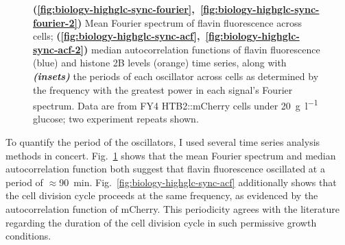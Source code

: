 \begin{figure}
  \caption{
    \textbf{(\ref{fig:biology-highglc-sync-fourier},~\ref{fig:biology-highglc-sync-fourier-2})} Mean Fourier spectrum of flavin fluorescence across cells; \textbf{(\ref{fig:biology-highglc-sync-acf},~\ref{fig:biology-highglc-sync-acf-2})} median autocorrelation functions of flavin fluorescence (blue) and histone 2B levels (orange) time series, along with \textit{\textbf{(insets)}} the periods of each oscillator across cells as determined by the frequency with the greatest power in each signal's Fourier spectrum.
    Data are from FY4 HTB2::mCherry cells under \SI{20}{\gram~\litre^{-1}} glucose; two experiment repeats shown.
  }
  \label{fig:biology-highglc-sync-spectral}
\end{figure}

To quantify the period of the oscillators, I used several time series analysis methods in concert.
Fig.\ \ref{fig:biology-highglc-sync-spectral} shows that the mean Fourier spectrum and median autocorrelation function both suggest that flavin fluorescence oscillated at a period of $\approx$\SI{90}{\minute}.
Fig.\ \ref{fig:biology-highglc-sync-acf} additionally shows that the cell division cycle proceeds at the same frequency, as evidenced by the autocorrelation function of mCherry.
This periodicity agrees with the literature regarding the duration of the cell division cycle in such permissive growth conditions. %


